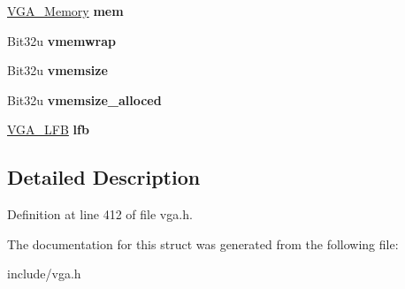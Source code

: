 \begin{DoxyCompactItemize}
\item 
\hypertarget{structVGA__Type_ade860ae7b9935ad2fd4613758b998c1b}{\hyperlink{structVGA__Memory}{V\-G\-A\-\_\-\-Memory} {\bfseries mem}}\label{structVGA__Type_ade860ae7b9935ad2fd4613758b998c1b}

\item 
\hypertarget{structVGA__Type_a85f587d439119bab0ede7a4af68dbe7b}{Bit32u {\bfseries vmemwrap}}\label{structVGA__Type_a85f587d439119bab0ede7a4af68dbe7b}

\item 
\hypertarget{structVGA__Type_ae57b5f807f1f894b4ecfb73525b4ca7d}{Bit32u {\bfseries vmemsize}}\label{structVGA__Type_ae57b5f807f1f894b4ecfb73525b4ca7d}

\item 
\hypertarget{structVGA__Type_aa9c3f8d9b25229c92dd03307295cc069}{Bit32u {\bfseries vmemsize\-\_\-alloced}}\label{structVGA__Type_aa9c3f8d9b25229c92dd03307295cc069}

\item 
\hypertarget{structVGA__Type_ab46a6c5770cc6e5a528e6456e998af78}{\hyperlink{structVGA__LFB}{V\-G\-A\-\_\-\-L\-F\-B} {\bfseries lfb}}\label{structVGA__Type_ab46a6c5770cc6e5a528e6456e998af78}

\end{DoxyCompactItemize}


\subsection{Detailed Description}


Definition at line 412 of file vga.\-h.



The documentation for this struct was generated from the following file\-:\begin{DoxyCompactItemize}
\item 
include/vga.\-h\end{DoxyCompactItemize}
